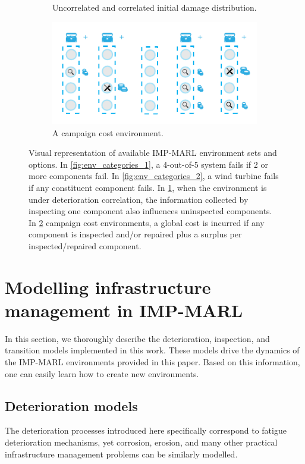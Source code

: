 \begin{figure}
\begin{subfigure}[t]{0.53\textwidth}
    \caption{Uncorrelated and correlated initial damage distribution.}
    \label{fig:env_categories_3}
\end{subfigure}%
\begin{subfigure}[t]{0.47\textwidth}
\centering
    \includegraphics[width=1\linewidth]{tex_thesis/figures/ch5/fig2_mul/environments_v2_d.pdf}
    \caption{A campaign cost environment.}
    \label{fig:env_categories_4}
\end{subfigure}
\caption{
Visual representation of available IMP-MARL environment sets and options.
In \ref{fig:env_categories_1}, a 4-out-of-5 system fails if 2 or more components fail.
In \ref{fig:env_categories_2}, a wind turbine fails if any constituent component fails.
In \ref{fig:env_categories_3}, when the environment is under deterioration correlation, the information collected by inspecting one component also influences uninspected components.
In \ref{fig:env_categories_4} campaign cost environments, a global cost is incurred if any component is inspected and/or repaired plus a surplus per inspected/repaired component. 
}
\label{fig:env_categories}
\end{figure}



\section{Modelling infrastructure management in IMP-MARL}
\label{App:pomdpModels}
In this section, we thoroughly describe the deterioration, inspection, and transition models implemented in this work. 
These models drive the dynamics of the IMP-MARL environments provided in this paper.
Based on this information, one can easily learn how to create new environments.

\subsection{Deterioration models}
The deterioration processes introduced here specifically correspond to fatigue deterioration mechanisms, yet corrosion, erosion, and many other practical infrastructure management problems can be similarly modelled.

